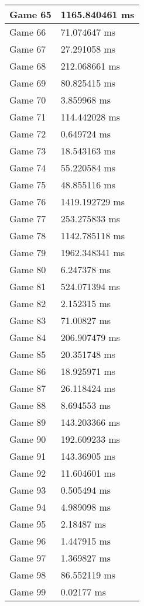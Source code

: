 \begin{multicols}{2}
\begin{tabular}{|l|l|}
	Game 65 & 1165.840461 ms \\ \hline
	Game 66 & 71.074647 ms \\ \hline
	Game 67 & 27.291058 ms \\ \hline
	Game 68 & 212.068661 ms \\ \hline
	Game 69 & 80.825415 ms \\ \hline
	Game 70 & 3.859968 ms \\ \hline
	Game 71 & 114.442028 ms \\ \hline
	Game 72 & 0.649724 ms \\ \hline
	Game 73 & 18.543163 ms \\ \hline
	Game 74 & 55.220584 ms \\ \hline
	Game 75 & 48.855116 ms \\ \hline
	Game 76 & 1419.192729 ms \\ \hline
	Game 77 & 253.275833 ms \\ \hline
	Game 78 & 1142.785118 ms \\ \hline
	Game 79 & 1962.348341 ms \\ \hline
	Game 80 & 6.247378 ms \\ \hline
	Game 81 & 524.071394 ms \\ \hline
	Game 82 & 2.152315 ms \\ \hline
	Game 83 & 71.00827 ms \\ \hline
	Game 84 & 206.907479 ms \\ \hline
	Game 85 & 20.351748 ms \\ \hline
	Game 86 & 18.925971 ms \\ \hline
	Game 87 & 26.118424 ms \\ \hline
	Game 88 & 8.694553 ms \\ \hline
	Game 89 & 143.203366 ms \\ \hline
	Game 90 & 192.609233 ms \\ \hline
	Game 91 & 143.36905 ms \\ \hline
	Game 92 & 11.604601 ms \\ \hline
	Game 93 & 0.505494 ms \\ \hline
	Game 94 & 4.989098 ms \\ \hline
	Game 95 & 2.18487 ms \\ \hline
	Game 96 & 1.447915 ms \\ \hline
	Game 97 & 1.369827 ms \\ \hline
	Game 98 & 86.552119 ms \\ \hline
	Game 99 & 0.02177 ms \\ \hline
\end{tabular}\\

\end{multicols}

